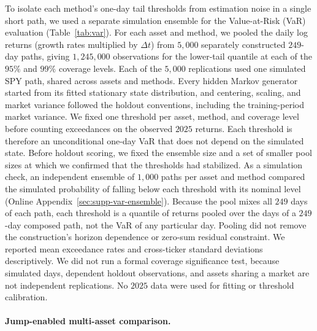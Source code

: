 To isolate each method's one-day tail thresholds from estimation
noise in a single short path, we used a separate simulation ensemble
for the Value-at-Risk (VaR) evaluation (Table~\ref{tab:var}). For each asset and method, we pooled the daily log returns (growth
rates multiplied by $\Delta t$) from $5{,}000$ separately constructed
$249$-day paths, giving $1{,}245{,}000$ observations for the lower-tail
quantile at each of the $95\%$ and $99\%$ coverage levels. Each of the $5{,}000$ replications used one simulated SPY path, shared
across assets and methods. Every hidden Markov generator started from
its fitted stationary state distribution, and centering, scaling, and market variance followed the holdout
conventions, including the training-period market variance. We fixed one threshold per asset, method, and
coverage level before counting exceedances on the observed $2025$ returns. Each threshold is therefore an
unconditional one-day VaR that does
not depend on the simulated state. Before holdout scoring, we fixed the ensemble size and a set of
smaller pool sizes at which we confirmed that the thresholds had
stabilized. As a simulation check, an independent ensemble of $1{,}000$
paths per asset and method compared the simulated probability of
falling below each threshold with its nominal level (Online
Appendix~\ref{sec:supp-var-ensemble}). Because the pool mixes all $249$ days of each path, each threshold is
a quantile of returns pooled over the days of a $249$-day composed
path, not the VaR of any particular day. Pooling did not remove the construction's horizon
dependence or zero-sum residual constraint. We reported mean
exceedance rates and cross-ticker standard deviations descriptively. We did not run a formal coverage
significance test, because
simulated days, dependent holdout observations, and assets sharing a
market are not independent replications. No $2025$ data were used for
fitting or threshold calibration.


\paragraph{Jump-enabled multi-asset comparison.}


